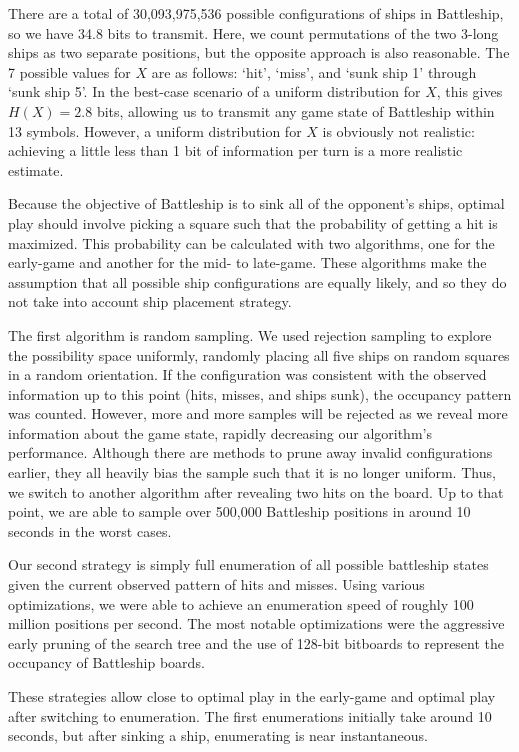 \documentclass[conference,letterpaper]{IEEEtran}
\begin{document}
    There are a total of 30,093,975,536 possible configurations of ships in Battleship, so we have 34.8 bits to transmit. Here, we count permutations of the two 3-long ships as two separate positions, but the opposite approach is also reasonable. The 7 possible values for $X$ are as follows: `hit', `miss', and `sunk ship 1' through `sunk ship 5'. In the best-case scenario of a uniform distribution for $X$, this gives $H(X) = 2.8$ bits, allowing us to transmit any game state of Battleship within 13 symbols. However, a uniform distribution for $X$ is obviously not realistic: achieving a little less than 1 bit of information per turn is a more realistic estimate.

    Because the objective of Battleship is to sink all of the opponent's ships, optimal play should involve picking a square such that the probability of getting a hit is maximized. This probability can be calculated with two algorithms, one for the early-game and another for the mid- to late-game. These algorithms make the assumption that all possible ship configurations are equally likely, and so they do not take into account ship placement strategy.

    The first algorithm is random sampling. We used rejection sampling to explore the possibility space uniformly, randomly placing all five ships on random squares in a random orientation. If the configuration was consistent with the observed information up to this point (hits, misses, and ships sunk), the occupancy pattern was counted. However, more and more samples will be rejected as we reveal more information about the game state, rapidly decreasing our algorithm's performance. Although there are methods to prune away invalid configurations earlier, they all heavily bias the sample such that it is no longer uniform. Thus, we switch to another algorithm after revealing two hits on the board. Up to that point, we are able to sample over 500,000 Battleship positions in around 10 seconds in the worst cases.

    Our second strategy is simply full enumeration of all possible battleship states given the current observed pattern of hits and misses. Using various optimizations, we were able to achieve an enumeration speed of roughly 100 million positions per second. The most notable optimizations were the aggressive early pruning of the search tree and the use of 128-bit bitboards to represent the occupancy of Battleship boards.

    These strategies allow close to optimal play in the early-game and optimal play after switching to enumeration. The first enumerations initially take around 10 seconds, but after sinking a ship, enumerating is near instantaneous.
\end{document}
